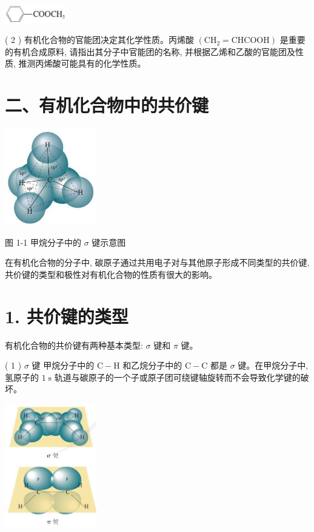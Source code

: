 \documentclass[10pt]{article}
\begin{document}
\begin{center}
\includegraphics[max width=0.2\textwidth]{images/0190efc5-b58a-7c43-bfb0-e0a030df9cfd_11_806869.jpg}
\end{center}

( 2 ) 有机化合物的官能团决定其化学性质。丙烯酸 \(\left( {{\mathrm{{CH}}}_{2} = \mathrm{{CHCOOH}}}\right)\) 是重要的有机合成原料, 请指出其分子中官能团的名称, 并根据乙烯和乙酸的官能团及性质, 推测丙烯酸可能具有的化学性质。

\section*{二、有机化合物中的共价键}

\begin{center}
\includegraphics[max width=0.3\textwidth]{images/0190efc5-b58a-7c43-bfb0-e0a030df9cfd_11_468575.jpg}
\end{center}

图 1-1 甲烷分子中的 \(\sigma\) 键示意图

在有机化合物的分子中, 碳原子通过共用电子对与其他原子形成不同类型的共价键, 共价键的类型和极性对有机化合物的性质有很大的影响。

\section*{1. 共价键的类型}

有机化合物的共价键有两种基本类型: \(\sigma\) 键和 \(\pi\) 键。

( 1 ) \(\sigma\) 键 甲烷分子中的 \(\mathrm{C} - \mathrm{H}\) 和乙烷分子中的 \(\mathrm{C} - \mathrm{C}\) 都是 \(\sigma\) 键。在甲烷分子中,氢原子的 \(1\mathrm{\;s}\) 轨道与碳原子的一个子或原子团可绕键轴旋转而不会导致化学键的破坏。

\begin{center}
\includegraphics[max width=0.3\textwidth]{images/0190efc5-b58a-7c43-bfb0-e0a030df9cfd_11_975257.jpg}
\end{center}
\end{document}
